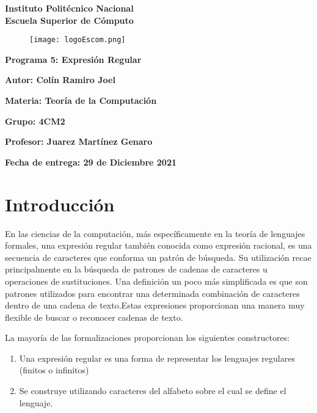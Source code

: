 \documentclass{article}
\begin{document}
	\begin{titlepage}
		\begin{center}
			{\huge\textbf{Instituto Politécnico Nacional}}\\
			\vspace{7mm}
			{\huge\textbf{Escuela Superior de Cómputo}}\\			
			\begin{figure}[h]
				\centering
				\texttt{[image: logoEscom.png]}
			\end{figure}	
			\vspace{1cm}
			{\huge\textbf{Programa 5: Expresión Regular}}
			\par\vspace{2cm}
			\large\textbf{Autor: Colín Ramiro Joel}
			\par\vspace{1cm}
			{\large\textbf{Materia: Teoría de la Computación}}
			\par\vspace{1cm}
			{\large\textbf{Grupo: 4CM2}}
			\par\vspace{1cm}
			{\large\textbf{Profesor: Juarez Martínez Genaro}}
			\par\vspace{1cm}
			{\large\textbf{Fecha de entrega: {\huge{29 de Diciembre 2021}}}}
			\par\vspace{3cm}
		\end{center}
	\end{titlepage}

	\section*{Introducción}
	En las ciencias de la computación, más específicamente en la teoría de lenguajes formales, una expresión regular también conocida como expresión racional, es una secuencia de caracteres que conforma un patrón de búsqueda. Su utilización recae principalmente en la búsqueda de patrones de cadenas de caracteres u operaciones de sustituciones.
	Una definición un poco más simplificada es que son patrones utilizados para encontrar una determinada combinación de caracteres dentro de una cadena de texto.Estas expresiones proporcionan una manera muy flexible de buscar o reconocer cadenas de texto.
	
	La mayoría de las formalizaciones proporcionan los siguientes constructores: 
	\begin{enumerate}
		\item Una expresión regular es una forma de representar los lenguajes regulares (finitos o infinitos)
		\item Se construye utilizando caracteres del alfabeto sobre el cual se define el lenguaje.
	\end{enumerate}
	
\end{document}
